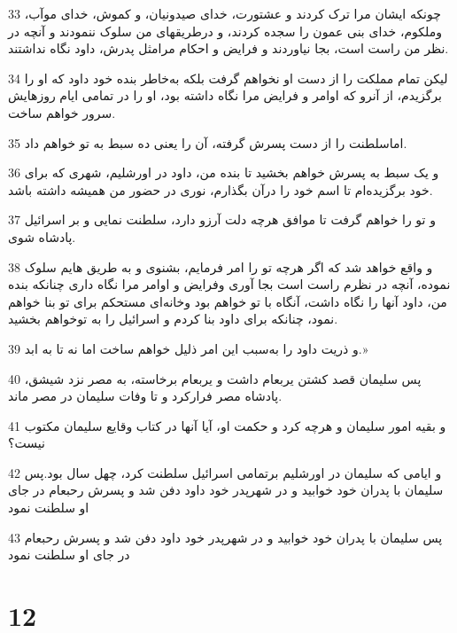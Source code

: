 \par 33 چونکه ایشان مرا ترک کردند و عشتورت، خدای صیدونیان، و کموش، خدای موآب، وملکوم، خدای بنی عمون را سجده کردند، و درطریقهای من سلوک ننمودند و آنچه در نظر من راست است، بجا نیاوردند و فرایض و احکام مرامثل پدرش، داود نگاه نداشتند.
\par 34 لیکن تمام مملکت را از دست او نخواهم گرفت بلکه به‌خاطر بنده خود داود که او را برگزیدم، از آنرو که اوامر و فرایض مرا نگاه داشته بود، او را در تمامی ایام روزهایش سرور خواهم ساخت.
\par 35 اماسلطنت را از دست پسرش گرفته، آن را یعنی ده سبط به تو خواهم داد.
\par 36 و یک سبط به پسرش خواهم بخشید تا بنده من، داود در اورشلیم، شهری که برای خود برگزیده‌ام تا اسم خود را درآن بگذارم، نوری در حضور من همیشه داشته باشد.
\par 37 و تو را خواهم گرفت تا موافق هر‌چه دلت آرزو دارد، سلطنت نمایی و بر اسرائیل پادشاه شوی.
\par 38 و واقع خواهد شد که اگر هر‌چه تو را امر فرمایم، بشنوی و به طریق هایم سلوک نموده، آنچه در نظرم راست است بجا آوری وفرایض و اوامر مرا نگاه داری چنانکه بنده من، داود آنها را نگاه داشت، آنگاه با تو خواهم بود وخانه‌ای مستحکم برای تو بنا خواهم نمود، چنانکه برای داود بنا کردم و اسرائیل را به توخواهم بخشید.
\par 39 و ذریت داود را به‌سبب این امر ذلیل خواهم ساخت اما نه تا به ابد.»
\par 40 پس سلیمان قصد کشتن یربعام داشت و یربعام برخاسته، به مصر نزد شیشق، پادشاه مصر فرارکرد و تا وفات سلیمان در مصر ماند.
\par 41 و بقیه امور سلیمان و هر‌چه کرد و حکمت او، آیا آنها در کتاب وقایع سلیمان مکتوب نیست؟
\par 42 و ایامی که سلیمان در اورشلیم برتمامی اسرائیل سلطنت کرد، چهل سال بود.پس سلیمان با پدران خود خوابید و در شهرپدر خود داود دفن شد و پسرش رحبعام در جای او سلطنت نمود
\par 43 پس سلیمان با پدران خود خوابید و در شهرپدر خود داود دفن شد و پسرش رحبعام در جای او سلطنت نمود
 
\chapter{12}

